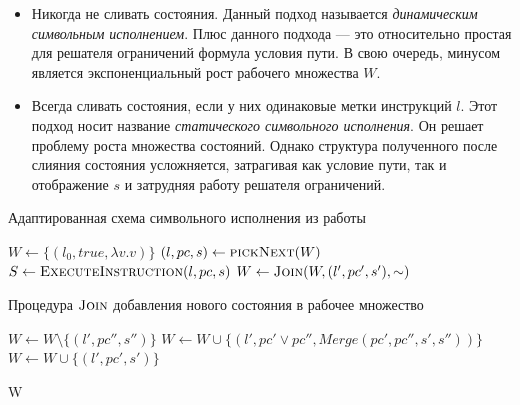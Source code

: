 \begin{enumerate}
    \begin{itemize}
        \item Никогда не сливать состояния. Данный подход называется \emph{динамическим символьным исполнением}. Плюс данного подхода --- это относительно простая для решателя ограничений формула условия пути. В свою очередь, минусом является экспоненциальный рост рабочего множества $W$.
        \item Всегда сливать состояния, если у них одинаковые метки инструкций $l$. Этот подход носит название \emph{статического символьного исполнения}. Он решает проблему роста множества состояний. Однако структура полученного после слияния состояния усложняется, затрагивая как условие пути, так и отображение $s$ и затрудняя работу решателя ограничений.
    \end{itemize}
\end{enumerate}

\begin{algorithm}
    \caption{Адаптированная схема символьного исполнения из работы~\cite{kuznetsov2012efficient}} \label{alg_kuznetsov}
\begin{algorithmic}[1]
        \State $W \gets \{(l_0, true, \lambda v.v)\}$
            \State $(l,pc,s) \gets \textsc{pickNext}(W)$ \label{pickNext}
            \State {}
            \State $S \gets \textsc{ExecuteInstruction}(l, pc, s)$
            \State {}
                \State $W \gets \textsc{Join}(W, (l',pc',s'),\sim)$
            \EndFor
        \EndWhile
        \State {}\;
    \EndProcedure
\end{algorithmic}
\end{algorithm}

\begin{algorithm}
    \caption{Процедура $\textsc{Join}$ добавления нового состояния в рабочее множество} \label{join}
\begin{algorithmic}[1]
            \State $W \gets W \setminus \{(l',pc'',s'')\}$
            \State $W \gets W \cup \{(l',pc' \lor pc'', Merge(pc',pc'',s', s''))\}$
        \Else
            \State $W \gets W \cup \{(l', pc', s')\}$
        \EndIf

        \State \Return W 
    \EndProcedure
\end{algorithmic}
\end{algorithm}


